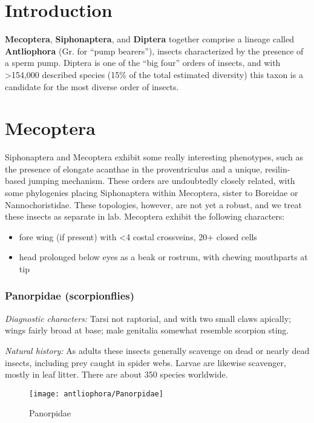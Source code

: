 \section*{Introduction}
\textbf{Mecoptera}, \textbf{Siphonaptera}, and \textbf{Diptera} together comprise a lineage called \textbf{Antliophora} (Gr. for ``pump bearers''), insects characterized by the presence of a sperm pump. Diptera is one of the ``big four'' orders of insects, and with \textgreater154,000 described species (15\% of the total estimated diversity) this taxon is a candidate for the most diverse order of insects.

\section{Mecoptera}
Siphonaptera and Mecoptera exhibit some really interesting phenotypes, such as the presence of elongate acanthae in the proventriculus and a unique, resilin-based jumping mechanism. These orders are undoubtedly closely related, with some phylogenies placing Siphonaptera within Mecoptera, sister to Boreidae or Nannochoristidae. These topologies, however, are not yet a robust, and we treat these insects as separate in lab. Mecoptera exhibit the following characters:
\begin{itemize}
\item fore wing (if present) with \textless4 costal crossveins, 20+ closed cells
\item head prolonged below eyes as a beak or rostrum, with chewing mouthparts at tip
\end{itemize}

\subsubsection{Panorpidae (scorpionflies)}
\noindent{}\textit{Diagnostic characters:} Tarsi not raptorial, and with two small claws apically; wings fairly broad at base; male genitalia somewhat resemble scorpion sting.\vspace{3mm}

\noindent{}\textit{Natural history:} As adults these insects generally scavenge on dead or nearly dead insects, including prey caught in spider webs. Larvae are likewise scavenger, mostly in leaf litter. There are about 350 species worldwide.

\begin{figure}[ht!]
  \centering
    \texttt{[image: antliophora/Panorpidae]}
  \caption{Panorpidae \citep[modified from Fig. 60 in][]{bhlitem105840ross}}
  \label{fig:panorpid}
\end{figure}

